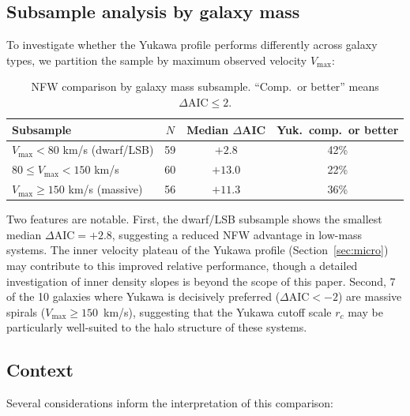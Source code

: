 \documentclass[11pt,a4paper]{article}
\begin{document}
\subsection{Subsample analysis by galaxy mass}
\label{sec:subsample}

To investigate whether the Yukawa profile performs differently
across galaxy types, we partition the sample by
maximum observed velocity $V_{\max}$:

\begin{table}[h]
\centering
\begin{tabular}{lccc}
\toprule
Subsample & $N$ & Median $\Delta$AIC & Yuk.\ comp.\ or better \\
\midrule
$V_{\max} < 80$ km/s (dwarf/LSB) & 59 & $+2.8$ & 42\% \\
$80 \leq V_{\max} < 150$ km/s & 60 & $+13.0$ & 22\% \\
$V_{\max} \geq 150$ km/s (massive) & 56 & $+11.3$ & 36\% \\
\bottomrule
\end{tabular}
\caption{NFW comparison by galaxy mass subsample.
``Comp.\ or better'' means $\Delta\mathrm{AIC} \leq 2$.}
\label{tab:subsample}
\end{table}

Two features are notable.
First, the dwarf/LSB subsample shows the smallest median
$\Delta\mathrm{AIC} = +2.8$, suggesting a reduced NFW advantage
in low-mass systems.
The inner velocity plateau of the Yukawa profile
(Section~\ref{sec:micro}) may contribute to this improved
relative performance, though a detailed investigation of
inner density slopes is beyond the scope of this paper.
Second, 7 of the 10 galaxies where Yukawa is decisively preferred
($\Delta\mathrm{AIC} < -2$) are massive spirals
($V_{\max} \geq 150$~km/s), suggesting that the Yukawa cutoff
scale $r_c$ may be particularly well-suited to the halo structure
of these systems.

\subsection{Context}

Several considerations inform the interpretation of this comparison:
\end{document}
